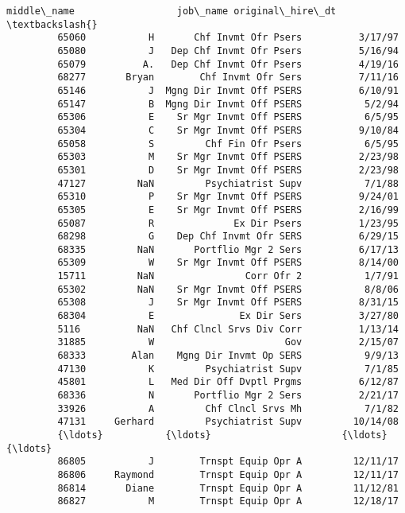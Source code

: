 \documentclass[11pt]{article}
\begin{document}
\begin{Verbatim}[commandchars=\\\{\}]
               middle\_name                  job\_name original\_hire\_dt  \textbackslash{}
         65060           H       Chf Invmt Ofr Psers          3/17/97   
         65080           J   Dep Chf Invmt Ofr Psers          5/16/94   
         65079          A.   Dep Chf Invmt Ofr Psers          4/19/16   
         68277       Bryan        Chf Invmt Ofr Sers          7/11/16   
         65146           J  Mgng Dir Invmt Off PSERS          6/10/91   
         65147           B  Mgng Dir Invmt Off PSERS           5/2/94   
         65306           E    Sr Mgr Invmt Off PSERS           6/5/95   
         65304           C    Sr Mgr Invmt Off PSERS          9/10/84   
         65058           S         Chf Fin Ofr Psers           6/5/95   
         65303           M    Sr Mgr Invmt Off PSERS          2/23/98   
         65301           D    Sr Mgr Invmt Off PSERS          2/23/98   
         47127         NaN         Psychiatrist Supv           7/1/88   
         65310           P    Sr Mgr Invmt Off PSERS          9/24/01   
         65305           E    Sr Mgr Invmt Off PSERS          2/16/99   
         65087           R              Ex Dir Psers          1/23/95   
         68298           G    Dep Chf Invmt Ofr SERS          6/29/15   
         68335         NaN       Portflio Mgr 2 Sers          6/17/13   
         65309           W    Sr Mgr Invmt Off PSERS          8/14/00   
         15711         NaN                Corr Ofr 2           1/7/91   
         65302         NaN    Sr Mgr Invmt Off PSERS           8/8/06   
         65308           J    Sr Mgr Invmt Off PSERS          8/31/15   
         68304           E               Ex Dir Sers          3/27/80   
         5116          NaN   Chf Clncl Srvs Div Corr          1/13/14   
         31885           W                       Gov          2/15/07   
         68333        Alan    Mgng Dir Invmt Op SERS           9/9/13   
         47130           K         Psychiatrist Supv           7/1/85   
         45801           L   Med Dir Off Dvptl Prgms          6/12/87   
         68336           N       Portflio Mgr 2 Sers          2/21/17   
         33926           A         Chf Clncl Srvs Mh           7/1/82   
         47131     Gerhard         Psychiatrist Supv         10/14/08   
         {\ldots}           {\ldots}                       {\ldots}              {\ldots}   
         86805           J        Trnspt Equip Opr A         12/11/17   
         86806     Raymond        Trnspt Equip Opr A         12/11/17   
         86814       Diane        Trnspt Equip Opr A         11/12/81   
         86827           M        Trnspt Equip Opr A         12/18/17   

\end{Verbatim}
\end{document}
